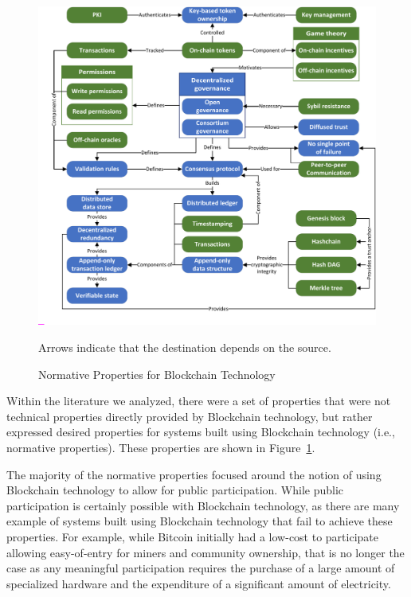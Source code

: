 \begin{figure}
	\centering
	\includegraphics[page=3,width=\columnwidth]{figures/grounded-theory-main}
	
	Arrows indicate that the destination depends on the source.
	\caption{Normative Properties for Blockchain Technology}
	\label{fig:normative-properties}
\end{figure}

Within the literature we analyzed, there were a set of properties that were not technical properties directly provided by Blockchain technology, but rather expressed desired properties for systems built using Blockchain technology (i.e., normative properties).
These properties are shown in Figure~\ref{fig:normative-properties}.

The majority of the normative properties focused around the notion of using Blockchain technology to allow for public participation.
While public participation is certainly possible with Blockchain technology, as there are many example of systems built using Blockchain technology that fail to achieve these properties.
For example, while Bitcoin initially had a low-cost to participate allowing easy-of-entry for miners and community ownership, that is no longer the case as any meaningful participation requires the purchase of a large amount of specialized hardware and the expenditure of a significant amount of electricity.

